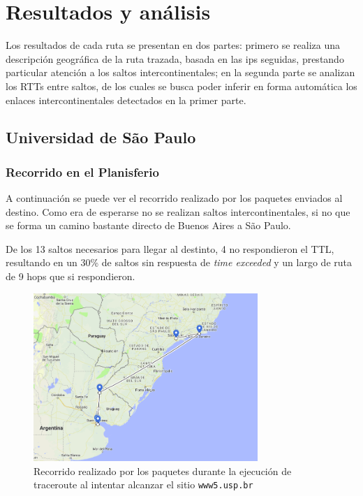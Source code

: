 \section{Resultados y análisis}

Los resultados de cada ruta se presentan en dos partes: primero se realiza una descripción geográfica de la ruta trazada, basada en las ips seguidas, prestando particular atención a los saltos intercontinentales; en la segunda parte se analizan los RTTs entre saltos, de los cuales se busca poder inferir en forma automática los enlaces intercontinentales detectados en la primer parte.

\subsection*{Universidad de São Paulo}

\subsubsection*{Recorrido en el Planisferio}

A continuación se puede ver el recorrido realizado por los paquetes enviados al destino. Como era de esperarse no se realizan saltos intercontinentales, si no que se forma un camino bastante directo de Buenos Aires a São Paulo.

De los 13 saltos necesarios para llegar al destinto, 4 no respondieron el TTL, resultando en un 30\% de saltos sin respuesta de \emph{time exceeded} y un largo de ruta de 9 hops que si respondieron.

\begin{figure}[H]
  \centering
  \includegraphics[width=8.5cm]{figs/saopaulo.png}
  \caption{\footnotesize Recorrido realizado por los paquetes durante la ejecución de traceroute al intentar alcanzar el sitio \texttt{www5.usp.br}}
\end{figure}

